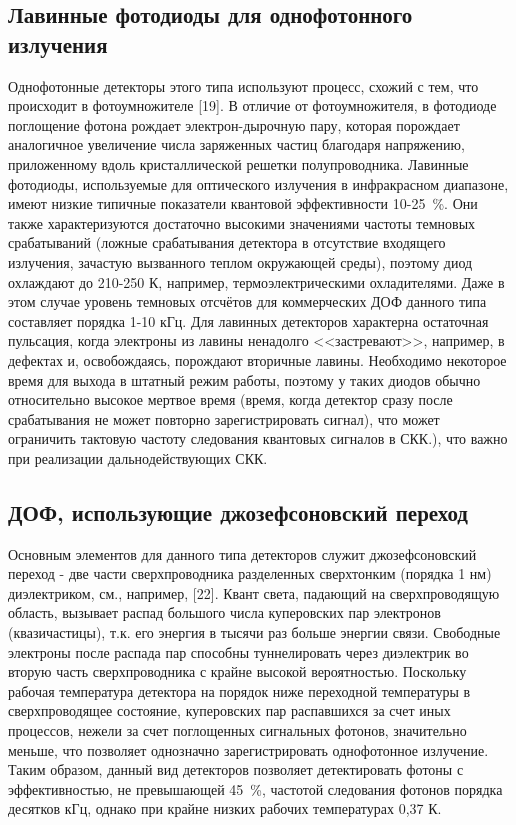 \subsection{Лавинные фотодиоды для однофотонного излучения} \label{subsec:ch1/sec5/sub3}

Однофотонные детекторы этого типа используют процесс, схожий с тем, что происходит в фотоумножителе [19]. В отличие от фотоумножителя, в фотодиоде поглощение фотона рождает электрон-дырочную пару, которая порождает аналогичное увеличение числа заряженных частиц благодаря напряжению, приложенному вдоль кристаллической решетки полупроводника. Лавинные фотодиоды, используемые для оптического излучения в инфракрасном диапазоне, имеют низкие типичные показатели квантовой эффективности 10-25~\%. Они также характеризуются достаточно высокими значениями частоты темновых срабатываний (ложные срабатывания детектора в отсутствие входящего излучения, зачастую вызванного теплом окружающей среды), поэтому диод охлаждают до 210-250 К, например, термоэлектрическими охладителями. Даже в этом случае уровень темновых отсчётов для коммерческих ДОФ данного типа составляет порядка 1-10 кГц. Для лавинных детекторов характерна остаточная пульсация, когда электроны из лавины ненадолго <<застревают>>, например, в дефектах и, освобождаясь, порождают вторичные лавины. Необходимо некоторое время для выхода в штатный режим работы, поэтому у таких диодов обычно относительно высокое мертвое время (время, когда детектор сразу после срабатывания не может повторно зарегистрировать сигнал), что может ограничить тактовую частоту следования квантовых сигналов в СКК.), что важно при реализации дальнодействующих СКК.

\subsection{ДОФ, использующие джозефсоновский переход} \label{subsec:ch1/sec5/sub4}

Основным элементов для данного типа детекторов служит джозефсоновский переход - две части сверхпроводника разделенных сверхтонким (порядка 1 нм) диэлектриком, см., например, [22]. Квант света, падающий на сверхпроводящую область, вызывает распад большого числа куперовских пар электронов (квазичастицы), т.\:к. его энергия в тысячи раз больше энергии связи. Свободные электроны после распада пар способны туннелировать через диэлектрик во вторую часть сверхпроводника с крайне высокой вероятностью. Поскольку рабочая температура детектора на порядок ниже переходной температуры в сверхпроводящее состояние, куперовских пар распавшихся за счет иных процессов, нежели за счет поглощенных сигнальных фотонов, значительно меньше, что позволяет однозначно зарегистрировать однофотонное излучение. Таким образом, данный вид детекторов позволяет детектировать фотоны с эффективностью, не превышающей 45~\%, частотой следования фотонов порядка десятков кГц, однако при крайне низких рабочих температурах 0,37 К.

